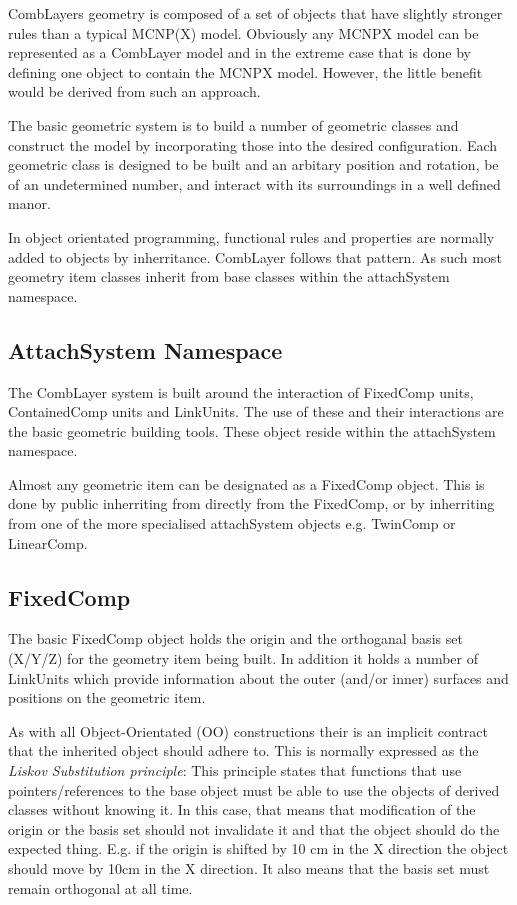 CombLayers geometry is composed of a set of objects that have slightly
stronger rules than a typical MCNP(X) model. Obviously any MCNPX model
can be represented as a CombLayer model and in the extreme case that
is done by defining one object to contain the MCNPX model. However, the
little benefit would be derived from such an approach.

The basic geometric system is to build a number of geometric classes
and construct the model by incorporating those into the desired
configuration. Each geometric class is designed to be built and an
arbitary position and rotation, be of an undetermined number, and
interact with its surroundings in a well defined manor. 

In object orientated programming, functional rules and properties are
normally added to objects by inherritance. CombLayer follows that
pattern. As such most geometry item classes inherit from base classes within 
the attachSystem namespace.

\subsection{AttachSystem Namespace}
\label{AttachSystem}

The CombLayer system is built around the interaction of FixedComp
units, ContainedComp units and LinkUnits. The use of these and their
interactions are the basic geometric building tools. These object
reside within the attachSystem namespace.

Almost any geometric item can be designated as a FixedComp
object. This is done by public inherriting from directly from the
FixedComp, or by inherriting from one of the more specialised attachSystem
objects e.g. TwinComp or LinearComp. 

\subsection{FixedComp}

The basic FixedComp object holds the origin and the orthoganal basis
set (X/Y/Z) for the geometry item being built. In addition it holds a 
number of LinkUnits which provide information about the outer (and/or inner)
surfaces and positions on the geometric item. 

As with all Object-Orientated (OO) constructions their is an implicit
contract that the inherited object should adhere to. This is normally
expressed as the {\it Liskov Substitution principle}: This principle
states that functions that use pointers/references to the base object
must be able to use the objects of derived classes without knowing
it. In this case, that means that modification of the origin or the
basis set should not invalidate it and that the object should do the
expected thing. E.g. if the origin is shifted by 10 cm in the X
direction the object should move by 10cm in the X direction. It also
means that the basis set must remain orthogonal at all time.

